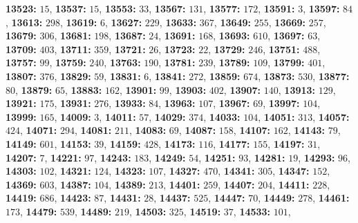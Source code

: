 \textsf{\bfseries 13523:} $15$, \textsf{\bfseries 13537:} $15$, \textsf{\bfseries 13553:} $33$, \textsf{\bfseries 13567:} $131$, \textsf{\bfseries 13577:} $172$, \textsf{\bfseries 13591:} $3$, \textsf{\bfseries 13597:} $84$, \textsf{\bfseries 13613:} $298$, \textsf{\bfseries 13619:} $6$, \textsf{\bfseries 13627:} $229$, \textsf{\bfseries 13633:} $367$, \textsf{\bfseries 13649:} $255$, \textsf{\bfseries 13669:} $257$, \textsf{\bfseries 13679:} $306$, \textsf{\bfseries 13681:} $198$, \textsf{\bfseries 13687:} $24$, \textsf{\bfseries 13691:} $168$, \textsf{\bfseries 13693:} $610$, \textsf{\bfseries 13697:} $63$, \textsf{\bfseries 13709:} $403$, \textsf{\bfseries 13711:} $359$, \textsf{\bfseries 13721:} $26$, \textsf{\bfseries 13723:} $22$, \textsf{\bfseries 13729:} $246$, \textsf{\bfseries 13751:} $488$, \textsf{\bfseries 13757:} $99$, \textsf{\bfseries 13759:} $240$, \textsf{\bfseries 13763:} $190$, \textsf{\bfseries 13781:} $239$, \textsf{\bfseries 13789:} $109$, \textsf{\bfseries 13799:} $401$, \textsf{\bfseries 13807:} $376$, \textsf{\bfseries 13829:} $59$, \textsf{\bfseries 13831:} $6$, \textsf{\bfseries 13841:} $272$, \textsf{\bfseries 13859:} $674$, \textsf{\bfseries 13873:} $530$, \textsf{\bfseries 13877:} $80$, \textsf{\bfseries 13879:} $65$, \textsf{\bfseries 13883:} $162$, \textsf{\bfseries 13901:} $99$, \textsf{\bfseries 13903:} $402$, \textsf{\bfseries 13907:} $140$, \textsf{\bfseries 13913:} $129$, \textsf{\bfseries 13921:} $175$, \textsf{\bfseries 13931:} $276$, \textsf{\bfseries 13933:} $84$, \textsf{\bfseries 13963:} $107$, \textsf{\bfseries 13967:} $69$, \textsf{\bfseries 13997:} $104$, \textsf{\bfseries 13999:} $165$, \textsf{\bfseries 14009:} $3$, \textsf{\bfseries 14011:} $57$, \textsf{\bfseries 14029:} $374$, \textsf{\bfseries 14033:} $104$, \textsf{\bfseries 14051:} $313$, \textsf{\bfseries 14057:} $424$, \textsf{\bfseries 14071:} $294$, \textsf{\bfseries 14081:} $211$, \textsf{\bfseries 14083:} $69$, \textsf{\bfseries 14087:} $158$, \textsf{\bfseries 14107:} $162$, \textsf{\bfseries 14143:} $79$, \textsf{\bfseries 14149:} $601$, \textsf{\bfseries 14153:} $39$, \textsf{\bfseries 14159:} $428$, \textsf{\bfseries 14173:} $116$, \textsf{\bfseries 14177:} $155$, \textsf{\bfseries 14197:} $31$, \textsf{\bfseries 14207:} $7$, \textsf{\bfseries 14221:} $97$, \textsf{\bfseries 14243:} $183$, \textsf{\bfseries 14249:} $54$, \textsf{\bfseries 14251:} $93$, \textsf{\bfseries 14281:} $19$, \textsf{\bfseries 14293:} $96$, \textsf{\bfseries 14303:} $102$, \textsf{\bfseries 14321:} $124$, \textsf{\bfseries 14323:} $107$, \textsf{\bfseries 14327:} $470$, \textsf{\bfseries 14341:} $305$, \textsf{\bfseries 14347:} $152$, \textsf{\bfseries 14369:} $603$, \textsf{\bfseries 14387:} $104$, \textsf{\bfseries 14389:} $213$, \textsf{\bfseries 14401:} $259$, \textsf{\bfseries 14407:} $204$, \textsf{\bfseries 14411:} $228$, \textsf{\bfseries 14419:} $686$, \textsf{\bfseries 14423:} $87$, \textsf{\bfseries 14431:} $28$, \textsf{\bfseries 14437:} $525$, \textsf{\bfseries 14447:} $70$, \textsf{\bfseries 14449:} $278$, \textsf{\bfseries 14461:} $173$, \textsf{\bfseries 14479:} $539$, \textsf{\bfseries 14489:} $219$, \textsf{\bfseries 14503:} $325$, \textsf{\bfseries 14519:} $37$, \textsf{\bfseries 14533:} $101$, 
